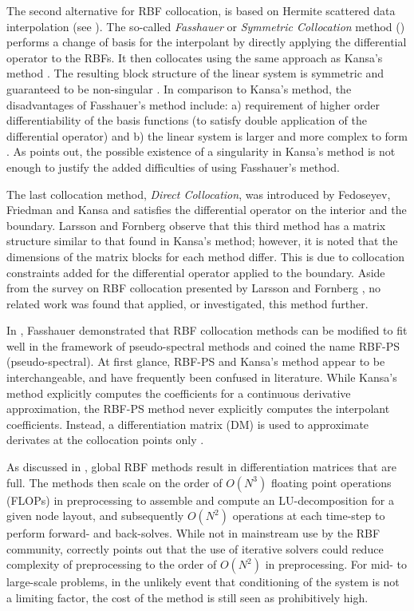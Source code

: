 \documentclass{report}
\begin{document}
{The second alternative for RBF collocation, is based on Hermite scattered 
data interpolation (see \cite{Wu1992}). The so-called \emph{Fasshauer} or \emph{Symmetric Collocation} method (\cite{Fasshauer1997}) 
performs a change of basis for the interpolant by directly applying the differential operator to the RBFs. It then collocates using the same approach as Kansa's method \cite{Stevens2009b, Larsson2003}. The resulting block structure of the linear system is symmetric and 
guaranteed to be non-singular \cite{Fasshauer1997}. In comparison to Kansa's method, the disadvantages of Fasshauer's method 
include: a) requirement of higher order differentiability of the basis functions (to satisfy double application of the differential operator)
and b) the linear system is larger and more complex to form
 \cite{Fasshauer2007}. As \cite{Hon2001} points out, 
the possible existence of a singularity in Kansa's method is not enough to justify the added difficulties of using Fasshauer's 
method.

The last collocation method, \emph{Direct Collocation}, was introduced by Fedoseyev, Friedman and Kansa
 \cite{Fedoseyev2002} and satisfies the differential operator on the interior and the boundary. Larsson and Fornberg \cite{Larsson2003} observe that this third method has a matrix structure similar to that found in Kansa's method; however, it is noted that the dimensions of the matrix blocks for each method differ. This is due to collocation constraints added for 
the differential operator applied to the boundary. Aside from the survey on RBF collocation presented by Larsson and Fornberg \cite{Larsson2003}, no related 
work was found that applied, or investigated, this method further. 

In \cite{Fasshauer2006}, Fasshauer demonstrated that RBF collocation methods can be modified to fit well in the framework of pseudo-spectral methods and coined the name RBF-PS (pseudo-spectral). At first glance, RBF-PS and Kansa's method appear to be interchangeable, and have frequently been confused in literature. While Kansa's method explicitly computes the coefficients for a continuous derivative approximation, the RBF-PS method never explicitly computes the interpolant coefficients. Instead, a differentiation matrix (DM) is used to approximate derivates at the collocation points only \cite{FasshauerZhang2007}. 

As discussed in \cite{FlyerWright09}, global RBF methods result in differentiation matrices that are full. The methods then scale on the order of $O(N^3)$ floating point operations (FLOPs) in preprocessing to assemble and compute an LU-decomposition for a given node layout, and subsequently $O(N^2)$ operations at each time-step to perform forward- and back-solves. While not in mainstream use by the RBF community, \cite{Morse2005} correctly points out that the use of iterative solvers could reduce complexity of preprocessing to the order of $O(N^2)$ in preprocessing. For mid- to large-scale problems, in the unlikely event that conditioning of the system is not a limiting factor, the cost of the method is still seen as prohibitively high. 

}
\end{document}
